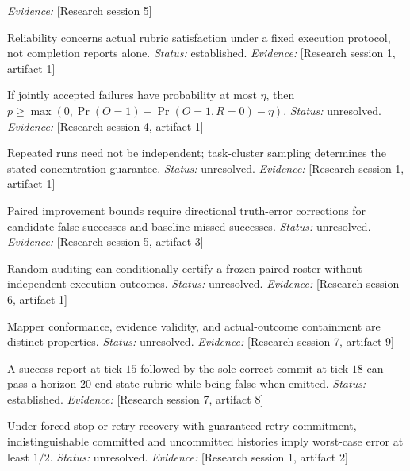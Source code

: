 \documentclass[11pt]{article}
\begin{document}
\begin{sloppypar}
\begin{description}
\textit{Evidence: }[Research session 5]
\item[C1] Reliability concerns actual rubric satisfaction under a fixed execution protocol, not completion reports alone. \textit{Status: }established.
\textit{Evidence: }[Research session 1, artifact 1]
\item[C2] If jointly accepted failures have probability at most $\eta$, then $p\geq\max(0,\Pr(O=1)-\Pr(O=1,R=0)-\eta)$. \textit{Status: }unresolved.
\textit{Evidence: }[Research session 4, artifact 1]
\item[C3] Repeated runs need not be independent; task-cluster sampling determines the stated concentration guarantee. \textit{Status: }unresolved.
\textit{Evidence: }[Research session 1, artifact 1]
\item[C4] Paired improvement bounds require directional truth-error corrections for candidate false successes and baseline missed successes. \textit{Status: }unresolved.
\textit{Evidence: }[Research session 5, artifact 3]
\item[C5] Random auditing can conditionally certify a frozen paired roster without independent execution outcomes. \textit{Status: }unresolved.
\textit{Evidence: }[Research session 6, artifact 1]
\item[C6] Mapper conformance, evidence validity, and actual-outcome containment are distinct properties. \textit{Status: }unresolved.
\textit{Evidence: }[Research session 7, artifact 9]
\item[C7] A success report at tick $15$ followed by the sole correct commit at tick $18$ can pass a horizon-$20$ end-state rubric while being false when emitted. \textit{Status: }established.
\textit{Evidence: }[Research session 7, artifact 8]
\item[C8] Under forced stop-or-retry recovery with guaranteed retry commitment, indistinguishable committed and uncommitted histories imply worst-case error at least $1/2$. \textit{Status: }unresolved.
\textit{Evidence: }[Research session 1, artifact 2]
\end{description}
\end{sloppypar}
\end{document}
